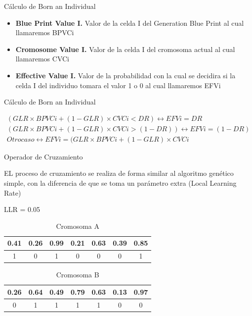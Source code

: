 \documentclass[10pt]{beamer}
\begin{document}
\begin{frame}{Cálculo de Born an Individual}

\begin{itemize}[<+- | alert@+>]
	\item \textbf{Blue Print Value I.} Valor de la celda I del Generation Blue
	Print al cual llamaremos \alert{BPVCi} 
	
	\item \textbf{Cromosome Value I.} Valor de la celda I del cromosoma actual
	al cual llamaremos \alert{CVCi}
	
	\item \textbf{Effective Value I.} Valor de la probabilidad con la cual se
	decidira si la celda I del individuo tomara el valor 1 o 0 al cual 
	llamaremos  \alert{EFVi}
\end{itemize}


\end{frame}

\begin{frame}{Cálculo de Born an Individual}



\begin{gather*}
	(GLR \times BPVCi + (1 - GLR) \times CVCi  < DR) \leftrightarrow  EFVi = DR\\
	(GLR \times BPVCi + (1 - GLR) \times CVCi  > (1 - DR)) \leftrightarrow EFVi = (1 - DR)\\
	Otro caso \leftrightarrow EFVi = (GLR \times BPVCi + (1 - GLR) \times CVCi
\end{gather*}



\end{frame}


\begin{frame}{Operador de Cruzamiento}

	EL proceso de cruzamiento se realiza de forma similar al algoritmo genético
	simple, con la diferencia de que se toma un parámetro extra \alert{(Local Learning Rate)}

		LLR = 0.05

		\begin{table}
 		\caption{Cromosoma A}
 		\begin{tabular}[t]{|c|c|c||c|c|c|c|}
			\hline
			0.41 & 0.26 & 0.99 & 0.21 & 0.63 & 0.39 & 0.85 \\
			\hline
			1 & 0 & 1 & 0 & 0 & 0 & 1\\
			\hline
		\end{tabular}
 	\end{table}
 	
 		\begin{table}
 		\caption{Cromosoma B}
 		\begin{tabular}[t]{|c|c|c||c|c|c|c|}
			\hline
			0.26 & 0.64 & 0.49 & 0.79 & 0.63 & 0.13 & 0.97 \\
			\hline
			0 & 1 & 1 & 1 & 1 & 0 & 0 \\
			\hline
		\end{tabular}
 	\end{table}
	
\end{frame}
\end{document}
